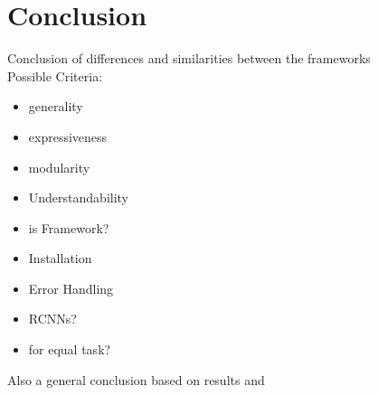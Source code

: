 \chapter{Conclusion}

Conclusion of differences and similarities between the frameworks\\

Possible Criteria: %
\begin{itemize}
	\item generality
	\item expressiveness
	\item modularity
	\item Understandability
	\item is Framework?
	\item Installation 
	\item Error Handling
	\item RCNNs?
	\item for equal task?
\end{itemize}
Also a general conclusion based on results and \cite{grzywaczewski2017training}